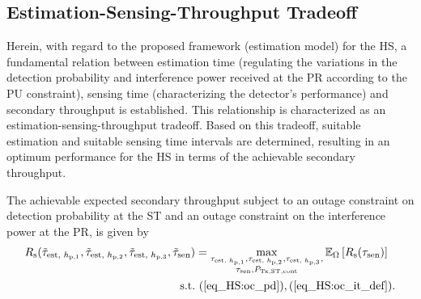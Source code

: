 \subsection{Estimation-Sensing-Throughput Tradeoff}
Herein, with regard to the proposed framework (estimation model) for the HS, a fundamental relation between estimation time (regulating the variations in the detection probability and interference power received at the PR according to the PU constraint), sensing time (characterizing the detector's performance) and secondary throughput is established. This relationship is characterized as an estimation-sensing-throughput tradeoff. Based on this tradeoff, suitable estimation and suitable sensing time intervals are determined, resulting in an optimum performance for the HS in terms of the achievable secondary throughput. 
\begin{theorem} \label{th_HS:th1}
\normalfont
The achievable expected secondary throughput subject to an outage constraint on detection probability at the ST and an outage constraint on the interference power at the PR, is given by
\begin{align}
R_{\text{s}}(\tilde{\tau}_{\text{est, $h_{\text{p,1}}$}}, \tilde{\tau}_{\text{est, $h_{\text{p,2}}$}}, \tilde{\tau}_{\text{est, $h_{\text{p,3}}$}}, \tilde{\tau}_{\text{sen}}) &= \operatorname*{max}_{\substack{\tau_{\text{est, $h_{\text{p,1}}$}}, \tau_{\text{est, $h_{\text{p,2}}$}}, \tau_{\text{est, $h_{\text{p,3}}$}}, \\ \tau_{\text{sen}}, P_{\text{Tx,ST,cont}}}} {\mathbb E}_{\Omega}\left[ R_{\text{s}}(\tau_{\text{sen}}) \right] \label{eq_HS:opT_em}\\
\text{s.t.} & \text{ } (\ref{eq_HS:oc_pd}), (\ref{eq_HS:oc_it_def}). \nonumber 
\end{align}
\end{theorem}
